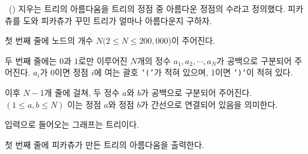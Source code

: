 \begin{problem}{\kcpcprobpretty\ (\kcpcprobprettyshort)}
    지우는 트리의 아름다움을 트리의 정점 중 아름다운 정점의 수라고 정의했다. 피카츄를 도와 피카츄가 꾸민 트리가 얼마나 아름다운지 구하자.
    
    \InputFile
    첫 번째 줄에 노드의 개수 $N(2 \leq N \leq 200,000$)이 주어진다.
    
    두 번째 줄에는 $0$과 $1$로만 이루어진 $N$개의 정수 $a_1, a_2, \cdots, a_N$가 공백으로 구분되어 주어진다. $a_i$가 0이면 정점 $i$에 여는 괄호 \texttt{'('}가 적혀 있으며, 1이면 \texttt{')'}이 적혀 있다.
    
    이후 $N-1$개 줄에 걸쳐, 두 정수 $a$와 $b$가 공백으로 구분되어 주어진다. $ (1 \leq a, b \leq N) $ 이는 정점 $a$와 정점 $b$가 간선으로 연결되어 있음을 의미한다.
    
    입력으로 들어오는 그래프는 트리이다.
    
    \OutputFile
    첫 번째 줄에 피카츄가 만든 트리의 아름다움을 출력한다.
    
    \Examples
    \begin{example}
    \end{example}
    

\end{problem}
